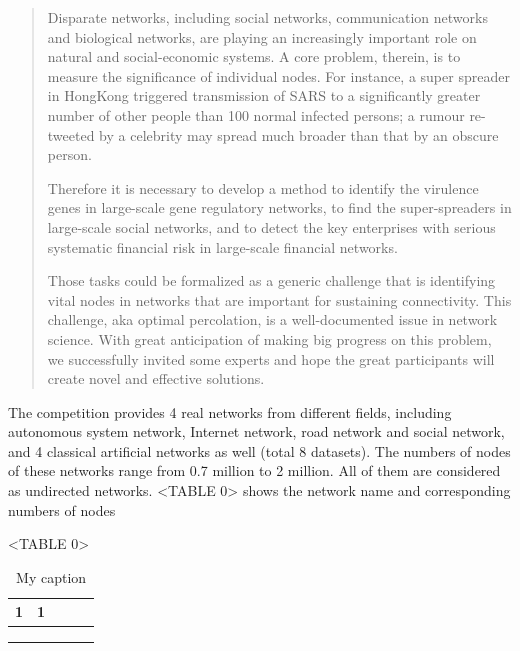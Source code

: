 \documentclass{article}
\newenvironment{itquote}
{\begin{quote}\itshape}
	{\end{quote}\ignorespacesafterend}
\begin{document}
	\begin{itquote}
		
		Disparate networks, including social networks, communication networks and biological networks, are playing an increasingly important role on natural and social-economic systems. A core problem, therein, is to measure the significance of individual nodes. For instance, a super spreader in HongKong triggered transmission of SARS to a significantly greater number of other people than 100 normal infected persons; a rumour re-tweeted by a celebrity may spread much broader than that by an obscure person.
		
		Therefore it is necessary to develop a method to identify the virulence genes in large-scale gene regulatory networks, to find the super-spreaders in large-scale social networks, and to detect the key enterprises with serious systematic financial risk in large-scale financial networks.
		
		Those tasks could be formalized as a generic challenge that is identifying vital nodes in networks that are important for sustaining connectivity. This challenge, aka optimal percolation, is a well-documented issue in network science. With great anticipation of making big progress on this problem, we successfully invited some experts and hope the great participants will create novel and effective solutions.  		
	\end{itquote}

	
	The competition provides 4 real networks from different fields, including autonomous system network, Internet network, road network and social network, and 4 classical artificial networks as well (total 8 datasets). The numbers of nodes of these networks range from 0.7 million to 2 million. All of them are considered as undirected networks. <TABLE 0> shows the network name and corresponding numbers of nodes 	
	
	<TABLE 0>
	
	\begin{table}[]
		\centering
		\caption{My caption}
		\label{my-label}
		\begin{tabular}{|l|l|l|l|l|}
			\hline
			1 & 1 &  &  &  \\ \hline
			&   &  &  &  \\ \hline
			&   &  &  &  \\ \hline
			&   &  &  &  \\ \hline
		\end{tabular}
	\end{table}
	
\end{document}
